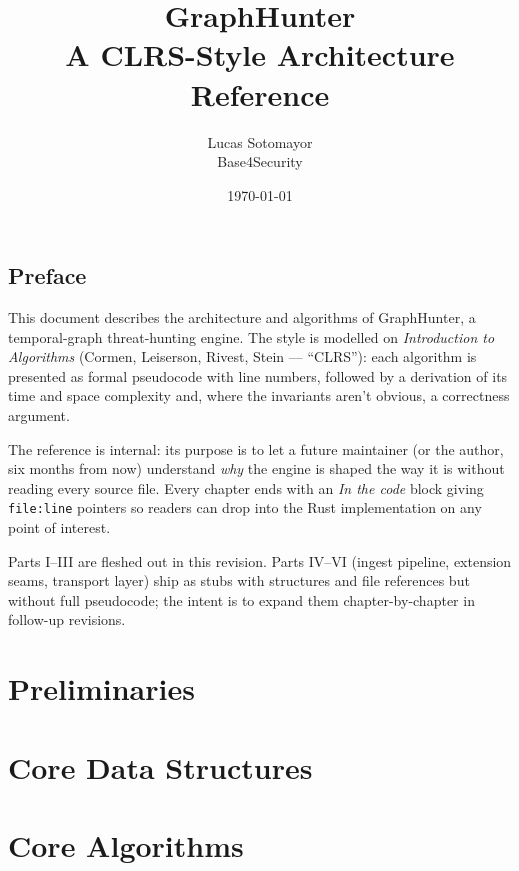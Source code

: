 \documentclass[11pt,openany]{book}
\title{\Huge GraphHunter\\
    \Large A CLRS-Style Architecture Reference}
\author{Lucas Sotomayor \\ \small Base4Security}
\date{\today}
\begin{document}
\frontmatter
\maketitle

\tableofcontents

\chapter*{Preface}

This document describes the architecture and algorithms of
GraphHunter, a temporal-graph threat-hunting engine. The style is
modelled on \emph{Introduction to Algorithms} (Cormen, Leiserson,
Rivest, Stein — ``CLRS''): each algorithm is presented as formal
pseudocode with line numbers, followed by a derivation of its time
and space complexity and, where the invariants aren't obvious, a
correctness argument.

The reference is internal: its purpose is to let a future maintainer
(or the author, six months from now) understand \emph{why} the
engine is shaped the way it is without reading every source file.
Every chapter ends with an \emph{In the code} block giving
\texttt{file:line} pointers so readers can drop into the Rust
implementation on any point of interest.

Parts I--III are fleshed out in this revision. Parts IV--VI (ingest
pipeline, extension seams, transport layer) ship as stubs with
structures and file references but without full pseudocode; the
intent is to expand them chapter-by-chapter in follow-up revisions.

\mainmatter

\part{Preliminaries}



\part{Core Data Structures}







\part{Core Algorithms}







\end{document}
